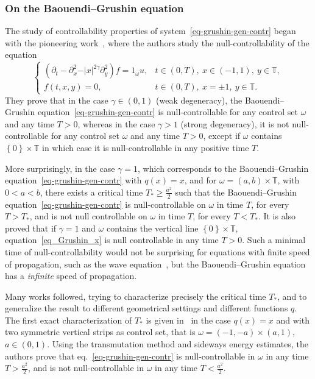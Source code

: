 \documentclass[AHL,Unicode,longabstracts,published]{cedram}
\renewcommand{\geq}{\geqslant}
\newcommand{\1}{\mathds 1}
\newcommand{\T}{\mathbb{T}}
\renewcommand{\o}{\omega}
\renewcommand{\o}{\omega}
\begin{document}
\subsubsection{On the Baouendi--Grushin equation}

The study of controllability properties of system~\eqref{eq-grushin-gen-contr} began with the pioneering work~\cite{BCG14}, where the authors study the null-controllability of the equation
\begin{equation}\label{eq_Grushin_x}
\left\{
\begin{array}{ll}
\left(\partial_t - \partial^2_{x} - \vert x\vert^{2\gamma} \partial^2_y\right) f = 1_\omega u, & t\in (0,T), \ x\in (-1,1),\ y \in \T,\\
f(t,x,y) = 0, & t \in (0,T), \ x = \pm 1, \ y \in \T.
\end{array}\right.
\end{equation}
They prove that in the case $\gamma \in (0,1)$ (weak degeneracy), the Baouendi--Grushin equation~\eqref{eq-grushin-gen-contr} is null-controllable for any control set $\o$ and any time $T>0$, whereas in the case $\gamma>1$ (strong degeneracy), it is not null-controllable for any control set $\omega$ and any time $T>0$, except if $\o$ contains $\left\lbrace 0 \right\rbrace \times \T$ in which case it is null-controllable in any positive time $T$.

More surprisingly, in the case $\gamma = 1$, which corresponds to the Baouendi--Grushin equation~\eqref{eq-grushin-gen-contr} with $q(x) = x$, and for $\omega = (a,b) \times \T$, with $0<a<b$, there exists a critical time $T_* \geq \frac{a^2}{2}$ such that the Baouendi--Grushin equation~\eqref{eq-grushin-gen-contr} is null-controllable on $\o$ in time $T$, for every $T> T_*$, and is not null controllable on $\o$ in time $T$, for every $T < T_*$. It is also proved that if $\gamma = 1$ and $\o$ contains the vertical line $\left\lbrace 0 \right\rbrace \times \T $, equation~\eqref{eq_Grushin_x} is null controllable in any time $T>0$. Such a minimal time of null-controllability would not be surprising for equations with finite speed of propagation, such as the wave equation~\cite{BLR92}, but the Baouendi--Grushin equation has a \emph{infinite} speed of propagation.

Many works followed, trying to characterize precisely the critical time $T_*$, and to generalize the result to different geometrical settings and different functions $q$. The first exact characterization of $T_*$ is given in~\cite{BMM15} in the case $q(x) = x$ and with two symmetric vertical strips as control set, that is $\o = (-1, - a) \times (a,1)$, $a \in (0,1)$. Using the transmutation method and sideways energy estimates, the authors prove that eq.~\eqref{eq-grushin-gen-contr} is null-controllable in $\o$ in any time $T> \frac{a^2}{2}$, and is not null-controllable in $\o$ in any time $T<\frac{a^2}{2}$.
\end{document}
